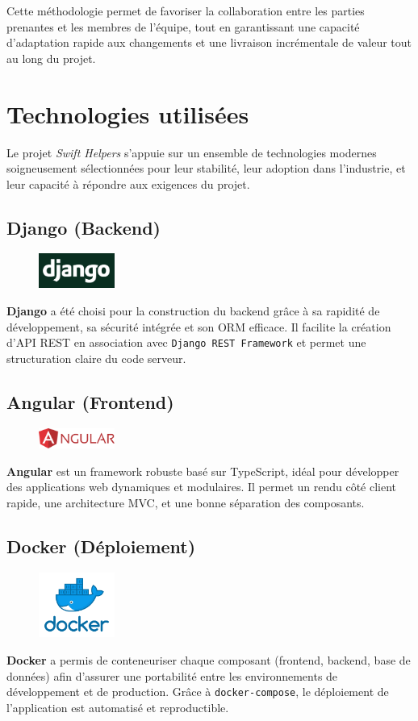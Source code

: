 Cette méthodologie permet de favoriser la collaboration entre les parties prenantes et les membres de l'équipe, tout en garantissant une capacité d'adaptation rapide aux changements et une livraison incrémentale de valeur tout au long du projet.
\section*{Technologies utilisées}

Le projet \textit{Swift Helpers} s’appuie sur un ensemble de technologies modernes soigneusement sélectionnées pour leur stabilité, leur adoption dans l’industrie, et leur capacité à répondre aux exigences du projet.

\subsection*{Django (Backend)}
\begin{figure}[H]
\centering
\includegraphics[width=2.5cm]{figures/django.png}
\end{figure}
\noindent
\textbf{Django} a été choisi pour la construction du backend grâce à sa rapidité de développement, sa sécurité intégrée et son ORM efficace. Il facilite la création d’API REST en association avec \texttt{Django REST Framework} et permet une structuration claire du code serveur.

\subsection*{Angular (Frontend)}
\begin{figure}[H]
\centering
\includegraphics[width=2.5cm]{figures/angular.png}
\end{figure}
\noindent
\textbf{Angular} est un framework robuste basé sur TypeScript, idéal pour développer des applications web dynamiques et modulaires. Il permet un rendu côté client rapide, une architecture MVC, et une bonne séparation des composants.

\subsection*{Docker (Déploiement)}
\begin{figure}[H]
\centering
\includegraphics[width=2.5cm]{figures/docker.png}
\end{figure}
\noindent
\textbf{Docker} a permis de conteneuriser chaque composant (frontend, backend, base de données) afin d’assurer une portabilité entre les environnements de développement et de production. Grâce à \texttt{docker-compose}, le déploiement de l’application est automatisé et reproductible.

